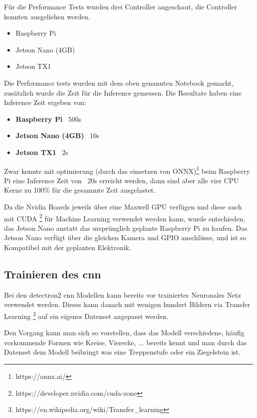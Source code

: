 Für die Performance Tests wurden drei Controller angeschaut, die Controller konnten ausgeliehen werden.

\begin{itemize}
    \item Raspberry Pi
    \item Jetson Nano (4GB)
    \item Jetson TX1
\end{itemize}


Die Performance tests wurden mit dem oben genannten Notebook gemacht, zusätzlich wurde die Zeit für die
Inference gemessen. Die Resultate haben eine Inference Zeit ergeben von:

\begin{itemize}
    \item {\bf Raspberry Pi}  ~500s
    \item {\bf Jetson Nano (4GB)} ~10s
    \item {\bf Jetson TX1} ~2s
\end{itemize}

Zwar konnte mit optimierung (durch das einsetzen von ONNX)\footnote{https://onnx.ai/} beim Raspberry Pi eine Inference Zeit von ~20s erreicht werden, 
dann sind aber alle vier CPU Kerne zu 100\% für die gesammte Zeit ausgelastet.

Da die Nvidia Boards jeweils über eine Maxwell GPU verfügen und diese auch mit CUDA \footnote{https://developer.nvidia.com/cuda-zone}
für Machine Learning verwendet werden kann, wurde entschieden, das Jetson Nano anstatt das ursprünglich geplante
Raspberry Pi zu kaufen. Das Jetson Nano verfügt über die gleichen Kamera und GPIO anschlüsse, und 
ist so Kompatibel mit der geplanten Elektronik.

\subsection{Trainieren des \acrshort{cnn}}

Bei den detectron2 \acrshort{cnn} Modellen kann bereits vor trainiertes Neuronales Netz
verwendet werden. Dieses kann danach mit wenigen hundert Bildern via Transfer Learning \footnote{https://en.wikipedia.org/wiki/Transfer\_learning}
auf ein eigenes Datenset angepasst werden.

Den Vorgang kann man sich so vorstellen, dass das Modell verschiedene, häufig vorkommende Formen wie Kreise, Vierecke, ...
bereits kennt und man durch das Datenset dem Modell beibringt was eine Treppenstufe oder ein Ziegelstein ist.

